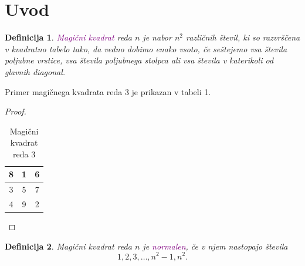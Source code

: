\documentclass[a4paper,12pt]{article}
\begin{document}
\section{Uvod}
{\theoremstyle{plain}

\newtheorem{definicija}{Definicija}[section]

}
\begin{definicija}
   \textcolor{purple}{\emph{Magični kvadrat}} reda $n$ je nabor $n^2$ različnih števil,
   ki so razvrščena v kvadratno tabelo tako, da vedno dobimo enako vsoto,
   če seštejemo vsa števila poljubne vrstice, vsa števila poljubnega
   stolpca ali vsa števila v katerikoli od glavnih diagonal.
\end{definicija}

Primer magičnega kvadrata reda 3 je prikazan v tabeli 1.
\begin{proof}
   

\begin{table}[h!]
  
      
   
   \centering
   \caption{Magični kvadrat reda 3} %
   \label{table:mag3} %
   \begin{tabular}{|c|c|c|}
   \hline
   8 & 1 & 6 \\ \hline
   3 & 5 & 7 \\ \hline
   4 & 9 & 2 \\ \hline
   \end{tabular}
      \end{table}
   \end{proof}



   



   






\newtheorem{novaDefinicija}{Definicija}
 \begin{definicija}
   Magični kvadrat reda $n$ je \textcolor{purple}{\emph{normalen}}, če v njem nastopajo števila
   \begin{equation}
      1, 2, 3, \ldots, n^2-1, n^2.
   \end{equation}
 \end{definicija}
\end{document}
